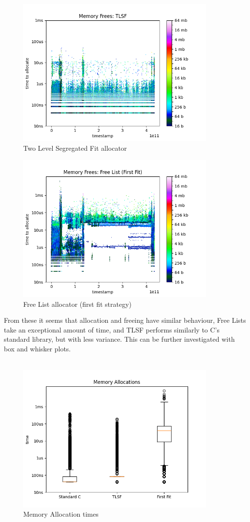 \documentclass{article}
\begin{document}
\begin{figure}[htbp]
	\centering
	\includegraphics[width=10cm]{results_tlsf_free}
	\captionsetup{width=10cm}
	\caption{Two Level Segregated Fit allocator}
\end{figure}
\begin{figure}[htbp]
	\centering
	\includegraphics[width=10cm]{results_first_free}
	\captionsetup{width=10cm}
	\caption{Free List allocator (first fit strategy)}
\end{figure}
\pagebreak
From these it seems that allocation and freeing have similar behaviour, Free Lists take an exceptional amount of time, and TLSF performs similarly to C's standard library, but with less variance. This can be further investigated with box and whisker plots.\\
\\
\begin{figure}[htbp]
	\centering
	\includegraphics[width=10cm]{boxplots_allocate}
	\captionsetup{width=10cm}
	\caption{Memory Allocation times}
\end{figure}
\end{document}
